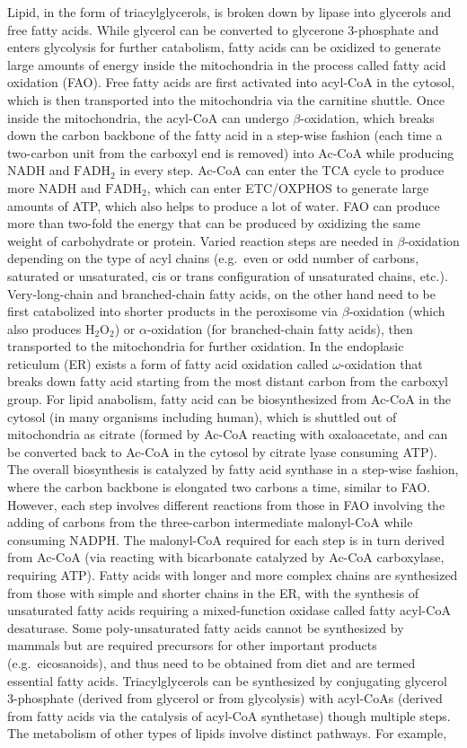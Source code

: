 \documentclass[12pt,twoside,openany,\mydriver]{thesis}  %
\begin{document}
Lipid, in the form of triacylglycerols, is broken down by lipase into glycerols and free fatty acids. While glycerol can be converted to glycerone 3-phosphate and enters glycolysis for further catabolism, fatty acids can be oxidized to generate large amounts of energy inside the mitochondria in the process called fatty acid oxidation (FAO). Free fatty acids are first activated into acyl-CoA in the cytosol, which is then transported into the mitochondria via the carnitine shuttle. Once inside the mitochondria, the acyl-CoA can undergo \(\beta\)-oxidation, which breaks down the carbon backbone of the fatty acid in a step-wise fashion (each time a two-carbon unit from the carboxyl end is removed) into Ac-CoA while producing NADH and \(\mathrm{FADH_2}\) in every step. Ac-CoA can enter the TCA cycle to produce more NADH and \(\mathrm{FADH_2}\), which can enter ETC/OXPHOS to generate large amounts of ATP, which also helps to produce a lot of water. FAO can produce more than two-fold the energy that can be produced by oxidizing the same weight of carbohydrate or protein. Varied reaction steps are needed in \(\beta\)-oxidation depending on the type of acyl chains (e.g.~even or odd number of carbons, saturated or unsaturated, cis or trans configuration of unsaturated chains, etc.). Very-long-chain and branched-chain fatty acids, on the other hand need to be first catabolized into shorter products in the peroxisome via \(\beta\)-oxidation (which also produces \(\mathrm{H_2O_2}\)) or \(\alpha\)-oxidation (for branched-chain fatty acids), then transported to the mitochondria for further oxidation. In the endoplasic reticulum (ER) exists a form of fatty acid oxidation called \(\omega\)-oxidation that breaks down fatty acid starting from the most distant carbon from the carboxyl group. For lipid anabolism, fatty acid can be biosynthesized from Ac-CoA in the cytosol (in many organisms including human), which is shuttled out of mitochondria as citrate (formed by Ac-CoA reacting with oxaloacetate, and can be converted back to Ac-CoA in the cytosol by citrate lyase consuming ATP). The overall biosynthesis is catalyzed by fatty acid synthase in a step-wise fashion, where the carbon backbone is elongated two carbons a time, similar to FAO. However, each step involves different reactions from those in FAO involving the adding of carbons from the three-carbon intermediate malonyl-CoA while consuming NADPH. The malonyl-CoA required for each step is in turn derived from Ac-CoA (via reacting with bicarbonate catalyzed by Ac-CoA carboxylase, requiring ATP). Fatty acids with longer and more complex chains are synthesized from those with simple and shorter chains in the ER, with the synthesis of unsaturated fatty acids requiring a mixed-function oxidase called fatty acyl-CoA desaturase. Some poly-unsaturated fatty acids cannot be synthesized by mammals but are required precursors for other important products (e.g.~eicosanoids), and thus need to be obtained from diet and are termed essential fatty acids. Triacylglycerols can be synthesized by conjugating glycerol 3-phosphate (derived from glycerol or from glycolysis) with acyl-CoAs (derived from fatty acids via the catalysis of acyl-CoA synthetase) though multiple steps. The metabolism of other types of lipids involve distinct pathways. For example, 
\end{document}
